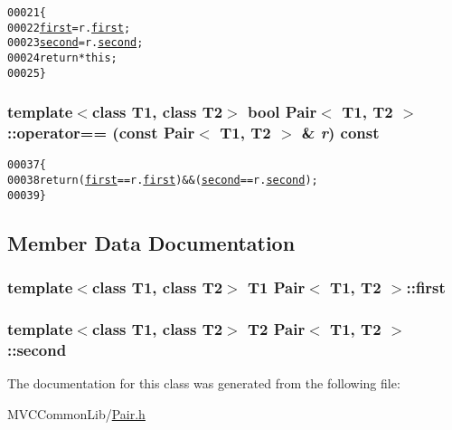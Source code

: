 \begin{footnotesize}\begin{alltt}
00021         \{
00022                 \hyperlink{class_pair_a3b0b4ac2336a2228fa2af5ceebe31804}{first} = r.\hyperlink{class_pair_a3b0b4ac2336a2228fa2af5ceebe31804}{first};
00023                 \hyperlink{class_pair_af56592579c6ce0d7e03bad0fcaa5d93e}{second} = r.\hyperlink{class_pair_af56592579c6ce0d7e03bad0fcaa5d93e}{second};
00024                 \textcolor{keywordflow}{return} *\textcolor{keyword}{this};
00025         \}
\end{alltt}\end{footnotesize}


\hypertarget{class_pair_a3578a7b13595aade4bb84d7a1948d498}{
\subsubsection[{operator==}]{\setlength{\rightskip}{0pt plus 5cm}template$<$class T1, class T2$>$ bool {\bf Pair}$<$ T1, T2 $>$::operator== (const {\bf Pair}$<$ T1, T2 $>$ \& {\em r}) const}}
\label{class_pair_a3578a7b13595aade4bb84d7a1948d498}




\begin{footnotesize}\begin{alltt}
00037         \{
00038                 \textcolor{keywordflow}{return} (\hyperlink{class_pair_a3b0b4ac2336a2228fa2af5ceebe31804}{first}==r.\hyperlink{class_pair_a3b0b4ac2336a2228fa2af5ceebe31804}{first}) && (\hyperlink{class_pair_af56592579c6ce0d7e03bad0fcaa5d93e}{second}==r.\hyperlink{class_pair_af56592579c6ce0d7e03bad0fcaa5d93e}{second});
00039         \}
\end{alltt}\end{footnotesize}




\subsection{Member Data Documentation}
\hypertarget{class_pair_a3b0b4ac2336a2228fa2af5ceebe31804}{
\subsubsection[{first}]{\setlength{\rightskip}{0pt plus 5cm}template$<$class T1, class T2$>$ T1 {\bf Pair}$<$ T1, T2 $>$::{\bf first}}}
\label{class_pair_a3b0b4ac2336a2228fa2af5ceebe31804}
\hypertarget{class_pair_af56592579c6ce0d7e03bad0fcaa5d93e}{
\subsubsection[{second}]{\setlength{\rightskip}{0pt plus 5cm}template$<$class T1, class T2$>$ T2 {\bf Pair}$<$ T1, T2 $>$::{\bf second}}}
\label{class_pair_af56592579c6ce0d7e03bad0fcaa5d93e}


The documentation for this class was generated from the following file:\begin{DoxyCompactItemize}
\item 
MVCCommonLib/\hyperlink{_pair_8h}{Pair.h}\end{DoxyCompactItemize}
